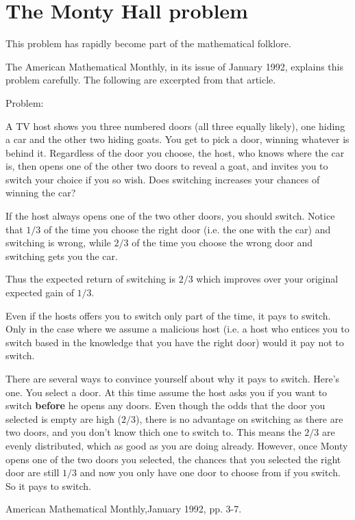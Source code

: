 \section{The Monty Hall problem}

This problem has rapidly become part of the mathematical folklore.

The American Mathematical Monthly, in its issue of January 1992,
explains this problem carefully. The following are excerpted from that
article.

Problem:

A TV host shows you three numbered doors (all three equally likely), one
hiding a car and the other two hiding goats. You get to pick a door,
winning whatever is behind it. Regardless of the door you choose, the
host, who knows where the car is, then opens one of the other two doors
to reveal a goat, and invites you to switch your choice if you so
wish. Does switching increases your chances of winning the car?

If the host always opens one of the two other doors, you should switch.
Notice that $1/3$ of the time you choose the right door (i.e. the one
with the car) and switching is wrong, while $2/3$ of the time you choose
the wrong door and switching gets you the car.

Thus the expected return of switching is $2/3$ which improves over your
original expected gain of $1/3$.

Even if the hosts offers you to switch only part of the time, it pays to
switch.  Only in the case where we assume a malicious host (i.e. a host
who entices you to switch based in the knowledge that you have the right
door) would it pay not to switch.

There are several ways to convince yourself about why it pays to switch.
Here's one. You select a door. At this time assume the host asks you if
you want to switch {\bf before} he opens any doors. Even though the odds
that the door you selected is empty are high ($2/3$), there is no
advantage on switching as there are two doors, and you don't know thich
one to switch to. This means the $2/3$ are evenly distributed, which as
good as you are doing already.  However, once Monty opens one of the two
doors you selected, the chances that you selected the right door are
still $1/3$ and now you only have one door to choose from if you
switch. So it pays to switch.


\Ref

 {American Mathematical
  Monthly,}{January 1992, pp. 3-7.}


